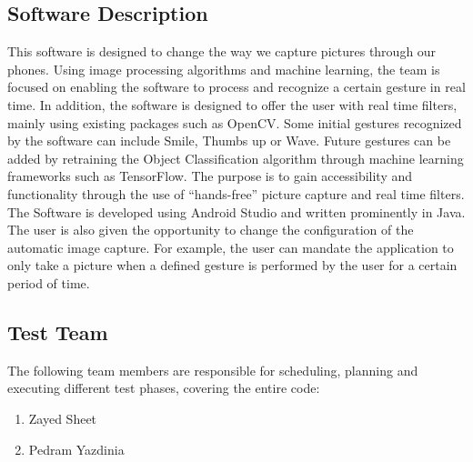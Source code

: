 \documentclass[12pt, titlepage]{article}
\begin{document}
\subsection{Software Description}
This software is designed to change the way we capture pictures through our phones. Using image processing algorithms and machine learning, the team is focused on enabling the software to process and recognize a certain gesture in real time. In addition, the software is designed to offer the user with real time filters, mainly using existing packages such as OpenCV. Some initial gestures recognized by the software can include Smile, Thumbs up or Wave. Future gestures can be added by retraining the Object Classification algorithm through machine learning frameworks such as TensorFlow. The purpose is to gain accessibility and functionality through the use of “hands-free” picture capture and real time filters. The Software is developed using Android Studio and written prominently in Java. The user is also given the opportunity to change the configuration of the automatic image capture. For example, the user can mandate the application to only take a picture when a defined gesture is performed by the user for a certain period of time. 

\subsection{Test Team}
The following team members are responsible for scheduling, planning and executing different test phases, covering the entire code:
\begin{enumerate}
    \item Zayed Sheet
    \item Pedram Yazdinia
\end{enumerate}
\end{document}
